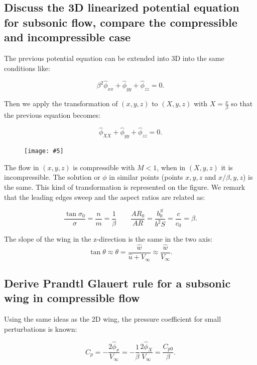 \documentclass[british,french,11pt, a4paper, openany]{article}
\newcommand{\wrapfig}[6]{%
	\begin{figure}%
		\vspace{-5mm}%
		\texttt{[image: \#5]}%
		\captionof{figure}{}%
		\label{#6}%
	\end{figure}%
}
\begin{document}
\subsection{Discuss the 3D linearized potential equation for subsonic flow, compare the	compressible and incompressible case}
The previous potential equation can be extended into 3D into the same conditions like: 

\begin{equation}
\beta ^2 \hat{\phi} _{xx} + \hat{\phi} _{yy} + \hat{\phi} _{zz} = 0.
\end{equation}

Then we apply the transformation of $(x, y, z)$ to $(X, y, z)$ with $X = \frac{x}{\beta}$ so that the previous equation becomes: 

\begin{equation}
\hat{\phi} _{XX} + \hat{\phi} _{yy} + \hat{\phi} _{zz} = 0.
\end{equation}

\wrapfig{7}{l}{6}{0.07}{ch7/1}{ch7/1}
The flow in $(x,y,z)$ is compressible with $M<1$, when in $(X,y,z)$ it is incompressible. The solution or $\phi$ in similar points (points $x,y,z$ and $x/\beta,y,z$) is the same. This kind of transformation is represented on the figure. We remark that the leading edges sweep and the aspect ratios are related as: 

\begin{equation}
\frac{\tan \sigma _0}{\sigma} = \frac{n}{m} = \frac{1}{\beta} \qquad \frac{AR_0}{AR} = \frac{b^S_0}{b^2S} = \frac{c}{c_0} = \beta. 
\end{equation}

The slope of the wing in the z-direction is the same in the two axis: 
\begin{equation}
\tan \theta \approx \theta = \frac{\hat{w}}{\hat{u}+V_\infty} \approx \frac{\hat{w}}{V_\infty}. 
\end{equation}



\subsection{Derive Prandtl Glauert rule for a subsonic wing in compressible flow}
Using the same ideas as the 2D wing, the pressure coefficient for small perturbations is known: 

\begin{equation}
C_p = -\frac{2\hat{\phi}_{x}}{V_\infty} = -\frac{1}{\beta}\frac{2\hat{\phi}_{X}}{V_\infty} = \frac{C_{p0}}{\beta}.
\end{equation}
\end{document}
